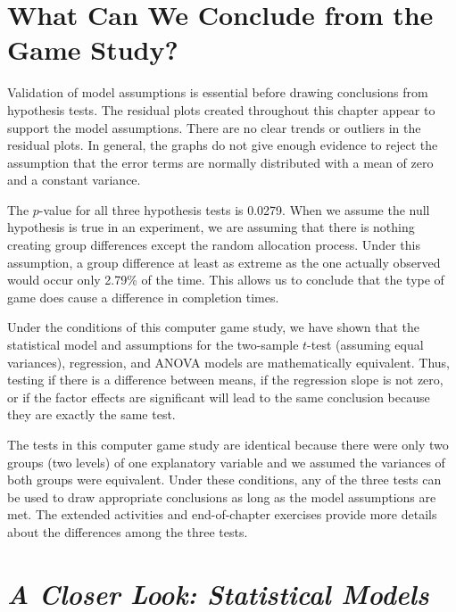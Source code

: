 \documentclass[
]{report}
\begin{document}
\hypertarget{what-can-we-conclude-from-the-game-study}{%
\section{\texorpdfstring{\textbf{What Can We Conclude from the Game Study?}}{What Can We Conclude from the Game Study?}}\label{what-can-we-conclude-from-the-game-study}}

Validation of model assumptions is essential before drawing conclusions from hypothesis tests. The residual plots created throughout this chapter appear to support the model assumptions. There are no clear trends or outliers in the residual plots. In general, the graphs do not give enough evidence to reject the assumption that the error terms are normally distributed with a mean of zero and a constant variance.

The \(p\)-value for all three hypothesis tests is 0.0279. When we assume the null hypothesis is true in an experiment, we are assuming that there is nothing creating group differences except the random allocation process. Under this assumption, a group difference at least as extreme as the one actually observed would occur only 2.79\% of the time. This allows us to conclude that the type of game does cause a difference in completion times.

Under the conditions of this computer game study, we have shown that the statistical model and assumptions for the two-sample \(t\)-test (assuming equal variances), regression, and ANOVA models are mathematically equivalent. Thus, testing if there is a difference between means, if the regression slope is not zero, or if the factor effects are significant will lead to the same conclusion because they are exactly the same test.

The tests in this computer game study are identical because there were only two groups (two levels) of one explanatory variable and we assumed the variances of both groups were equivalent. Under these conditions, any of the three tests can be used to draw appropriate conclusions as long as the model assumptions are met. The extended activities and end-of-chapter exercises provide more details about the differences among the three tests.

\hypertarget{a-closer-look-statistical-models}{%
\section*{\texorpdfstring{\emph{A Closer Look: Statistical Models}}{A Closer Look: Statistical Models}}\label{a-closer-look-statistical-models}}
\end{document}
